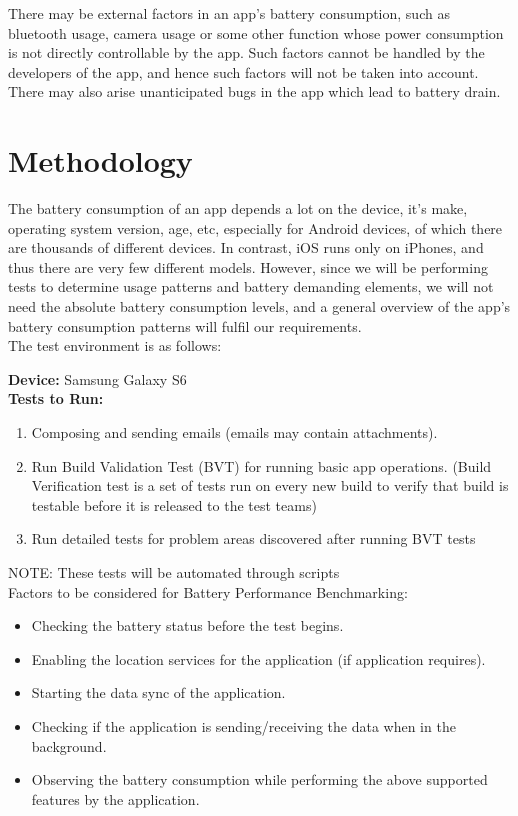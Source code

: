 \documentclass[a4paper,12pt]{article}
\begin{document}
There may be external factors in an app’s battery consumption, such as bluetooth usage, camera usage or some other function whose power consumption is not directly controllable by the app. Such factors cannot be handled by the developers of the app, and hence such factors will not be taken into account. There may also arise unanticipated bugs in the app which lead to battery drain. 


\section{Methodology}
The battery consumption of an app depends a lot on the device, it’s make, operating system version, age, etc, especially for Android devices, of which there are thousands of different devices. In contrast, iOS runs only on iPhones, and thus there are very few different models. However, since we will be performing tests to determine usage patterns and battery demanding elements, we will not need the absolute battery consumption levels, and a general overview of the app’s battery consumption patterns will fulfil our requirements.\\

The test environment is as follows:

\textbf{Device:} Samsung Galaxy S6\\

\textbf {Tests to Run:}
\begin{enumerate}
	\item Composing and sending emails (emails may contain attachments).
	\item Run Build Validation Test (BVT) for running basic app operations. (Build Verification test is a set of tests run on every new build to verify that build is testable before it is released to the test teams)
	\item Run detailed tests for problem areas discovered after running BVT tests 
\end{enumerate}
NOTE: These tests will be automated through scripts \\

Factors to be considered for Battery Performance Benchmarking:
\begin{itemize}
	\item Checking the battery status before the test begins.
	\item Enabling the location services for the application (if application requires).
	\item Starting the data sync of the application.
	\item Checking if the application is sending/receiving the data when in the background.
	\item Observing the battery consumption while performing the above supported features by the application.
\end{itemize}
\end{document}
